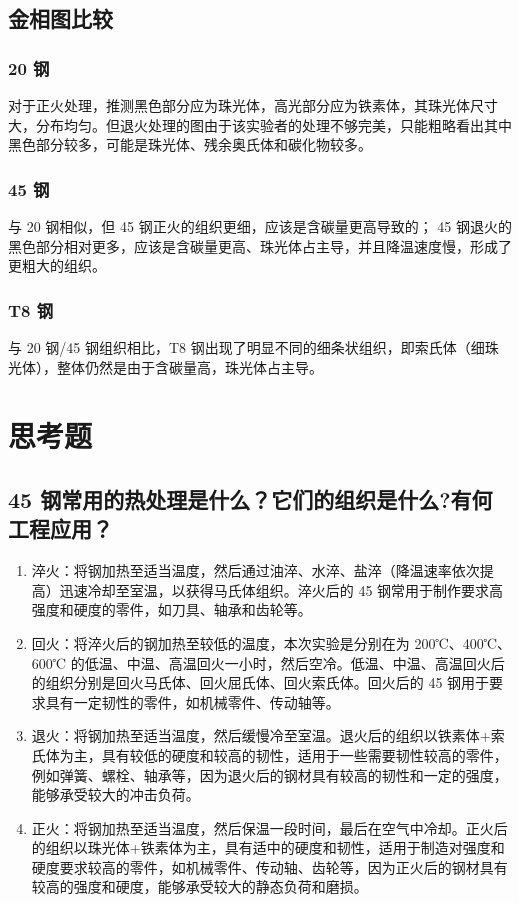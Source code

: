 \documentclass[a4paper,utf8]{article}
\begin{document}
    \subsection{金相图比较}
        \subsubsection{20 钢}
            对于正火处理，推测黑色部分应为珠光体，高光部分应为铁素体，其珠光体尺寸大，分布均匀。但退火处理的图由于该实验者的处理不够完美，只能粗略看出其中黑色部分较多，可能是珠光体、残余奥氏体和碳化物较多。
        \subsubsection{45 钢}
            与 20 钢相似，但 45 钢正火的组织更细，应该是含碳量更高导致的； 45 钢退火的黑色部分相对更多，应该是含碳量更高、珠光体占主导，并且降温速度慢，形成了更粗大的组织。
        \subsubsection{T8 钢}
            与 20 钢/45 钢组织相比，T8 钢出现了明显不同的细条状组织，即索氏体（细珠光体），整体仍然是由于含碳量高，珠光体占主导。
\section{思考题}
    \subsection{45 钢常用的热处理是什么？它们的组织是什么?有何工程应用？}
        \begin{enumerate}
            \item 淬火：将钢加热至适当温度，然后通过油淬、水淬、盐淬（降温速率依次提高）迅速冷却至室温，以获得马氏体组织。淬火后的 45 钢常用于制作要求高强度和硬度的零件，如刀具、轴承和齿轮等。
            \item 回火：将淬火后的钢加热至较低的温度，本次实验是分别在为 200℃、400℃、600℃ 的低温、中温、高温回火一小时，然后空冷。低温、中温、高温回火后的组织分别是回火马氏体、回火屈氏体、回火索氏体。回火后的 45 钢用于要求具有一定韧性的零件，如机械零件、传动轴等。
            \item 退火：将钢加热至适当温度，然后缓慢冷至室温。退火后的组织以铁素体+索氏体为主，具有较低的硬度和较高的韧性，适用于一些需要韧性较高的零件，例如弹簧、螺栓、轴承等，因为退火后的钢材具有较高的韧性和一定的强度，能够承受较大的冲击负荷。
            \item 正火：将钢加热至适当温度，然后保温一段时间，最后在空气中冷却。正火后的组织以珠光体+铁素体为主，具有适中的硬度和韧性，适用于制造对强度和硬度要求较高的零件，如机械零件、传动轴、齿轮等，因为正火后的钢材具有较高的强度和硬度，能够承受较大的静态负荷和磨损。
        \end{enumerate}
\end{document}
